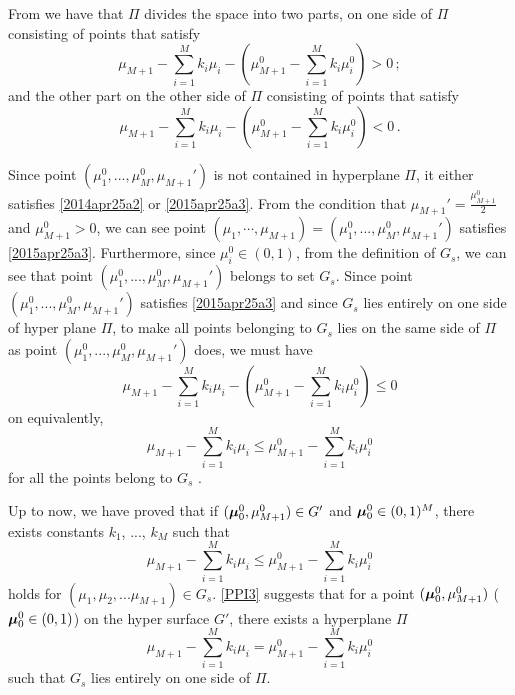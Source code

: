 From \cite{planeside} we have that $\Pi$ divides the space into two parts, on one side of $\Pi$ consisting of  points that satisfy
\begin{equation}
\mu_{M+1} - \sum_{i=1}^{M}k_i\mu_i - (\mu_{M+1}^0 - \sum_{i=1}^{M}k_i\mu_i^0) > 0\,;
\label{2014apr25a2}
\end{equation}
and the other part on the other side of $\Pi$ consisting of points that satisfy
\begin{equation}
\mu_{M+1} - \sum_{i=1}^{M}k_i\mu_i - (\mu_{M+1}^0 - \sum_{i=1}^{M}k_i\mu_i^0) < 0\,.
\label{2015apr25a3}
\end{equation}

Since point $(\mu_1^0, ..., \mu_M^0, \mu_{M+1}')$ is not contained in hyperplane $\Pi$, it either satisfies \eqref{2014apr25a2} or \eqref{2015apr25a3}. From the condition that $\mu_{M+1}' = \frac{\mu_{M+1}^0}{2}$ and $\mu_{M+1}^0 > 0$, we can see point  $(\mu_1, \cdots, \mu_{M+1}) = (\mu_1^0, ..., \mu_M^0, \mu_{M+1}')$ satisfies \eqref{2015apr25a3}.  
Furthermore, since $\mu_i^0 \in (0, 1)$, from the definition of $G_s$, we can see that point $(\mu_1^0, ..., \mu_M^0, \mu_{M+1}')$ belongs to set $G_s$. 
Since point $(\mu_1^0, ..., \mu_M^0, \mu_{M+1}')$ satisfies \eqref{2015apr25a3} and since $G_s$ lies entirely on one side of hyper plane $\Pi$, to make all points belonging to $G_s$ lies on the same side of $\Pi$ as point $(\mu_1^0, ..., \mu_M^0, \mu_{M+1}')$ does, we must have
\begin{equation}
\mu_{M+1} - \sum_{i=1}^{M}k_i\mu_i -  ( \mu_{M+1}^0 - \sum_{i=1}^{M}k_i\mu_i^0) \leq 0
\label{PI3}
\end{equation}
on equivalently,
\[
\mu_{M+1} - \sum_{i=1}^{M}k_i\mu_i \leq   \mu_{M+1}^0 - \sum_{i=1}^{M}k_i\mu_i^0
\]
for all the points belong to $G_s$ \cite{dantzig1951fundamental, planeside}. 

Up to now, we have proved that if  $(\boldsymbol{\mu}_0^0, \mu_{M+1}^0) \in G'$ and $\boldsymbol{\mu}_0^0 \in (0, 1)^M$, there exists constants $k_1$, ..., $k_M$ such that
\begin{equation}
\mu_{M+1} - \sum_{i=1}^{M}k_i\mu_i \leq \mu_{M+1}^0 - \sum_{i=1}^{M}k_i\mu_i^0
\label{PPI3}
\end{equation}
holds for  $(\mu_1, \mu_2, ...\mu_{M+1}) \in G_s$. 
\eqref{PPI3} suggests that for a point $(\boldsymbol{\mu}_0^0, \mu_{M+1}^0)$ ($\boldsymbol{\mu}_0^0 \in (0, 1)$) on the hyper surface $G'$, there exists a hyperplane $\Pi$ 
\[
\mu_{M+1} - \sum_{i=1}^{M}k_i\mu_i =  \mu_{M+1}^0 - \sum_{i=1}^{M}k_i\mu_i^0 
\]
such that $G_s$ lies entirely on one side of $\Pi$. 

